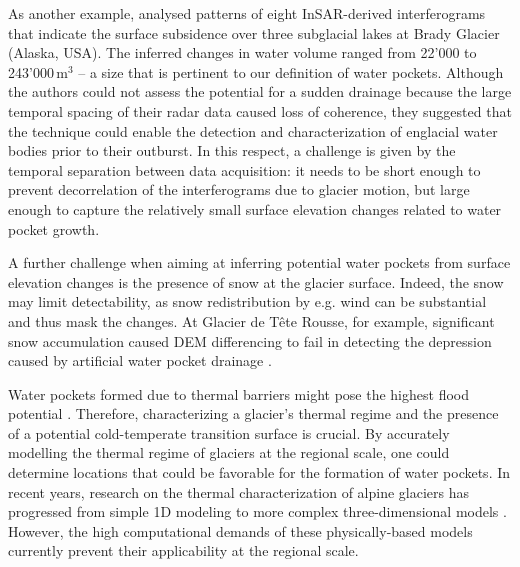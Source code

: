 As another example, \cite{Capps&al2010} analysed patterns of eight InSAR-derived interferograms that indicate the surface subsidence over three subglacial lakes at Brady Glacier (Alaska, USA). The inferred changes in water volume ranged from 22'000 to 243'000\,m$^3$ -- a size that is pertinent to our definition of water pockets. Although the authors could not assess the potential for a sudden drainage because the large temporal spacing of their radar data caused loss of coherence, they suggested that the technique could enable the detection and characterization of englacial water bodies prior to their outburst. In this respect, a challenge is given by the temporal separation between data acquisition: it needs to be short enough to prevent decorrelation of the interferograms due to glacier motion, but large enough to capture the relatively small surface elevation changes related to water pocket growth. 

A further challenge when aiming at inferring potential water pockets from surface elevation changes is the presence of snow at the glacier surface. Indeed, the snow may limit detectability, as snow redistribution by e.g. wind can be substantial and thus mask the changes. At Glacier de Tête Rousse, for example, significant snow accumulation caused DEM differencing to fail in detecting the depression caused by artificial water pocket drainage \citep{Gagliardini&al2011}.

Water pockets formed due to thermal barriers might pose the highest flood potential \citep{Vincent&al2010b}. Therefore, characterizing a glacier's thermal regime and the presence of a potential cold-temperate transition surface is crucial. By accurately modelling the thermal regime of glaciers at the regional scale, one could determine locations that could be favorable for the formation of water pockets. In recent years, research on the thermal characterization of alpine glaciers has progressed from simple 1D modeling \citep[e.g.][]{Gilbert&al2014,Huss&Fischer2016} to more complex three-dimensional models \citep[e.g.][]{Gilbert&al2015}. However, the high computational demands of these physically-based models currently prevent their applicability at the regional scale.

